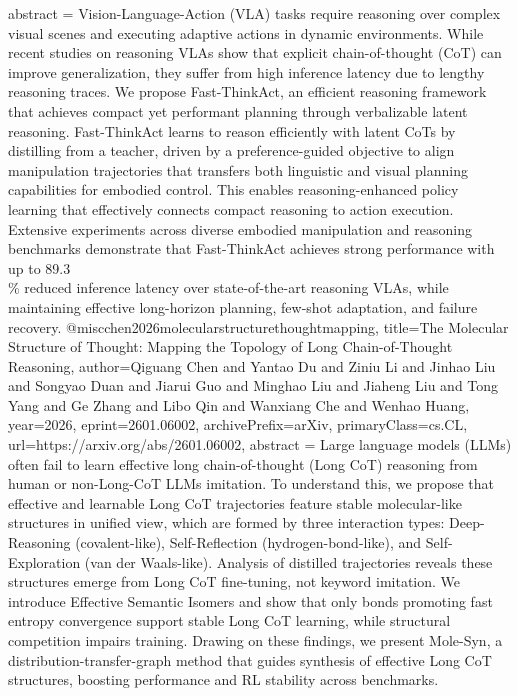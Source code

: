 {      abstract = {Vision-Language-Action (VLA) tasks require reasoning over complex visual scenes and executing adaptive actions in dynamic environments. While recent studies on reasoning VLAs show that explicit chain-of-thought (CoT) can improve generalization, they suffer from high inference latency due to lengthy reasoning traces. We propose Fast-ThinkAct, an efficient reasoning framework that achieves compact yet performant planning through verbalizable latent reasoning. Fast-ThinkAct learns to reason efficiently with latent CoTs by distilling from a teacher, driven by a preference-guided objective to align manipulation trajectories that transfers both linguistic and visual planning capabilities for embodied control. This enables reasoning-enhanced policy learning that effectively connects compact reasoning to action execution. Extensive experiments across diverse embodied manipulation and reasoning benchmarks demonstrate that Fast-ThinkAct achieves strong performance with up to 89.3\\\% reduced inference latency over state-of-the-art reasoning VLAs, while maintaining effective long-horizon planning, few-shot adaptation, and failure recovery.}
}@misc{chen2026molecularstructurethoughtmapping,
      title={The Molecular Structure of Thought: Mapping the Topology of Long Chain-of-Thought Reasoning}, 
      author={Qiguang Chen and Yantao Du and Ziniu Li and Jinhao Liu and Songyao Duan and Jiarui Guo and Minghao Liu and Jiaheng Liu and Tong Yang and Ge Zhang and Libo Qin and Wanxiang Che and Wenhao Huang},
      year={2026},
      eprint={2601.06002},
      archivePrefix={arXiv},
      primaryClass={cs.CL},
      url={https://arxiv.org/abs/2601.06002},
      abstract = {Large language models (LLMs) often fail to learn effective long chain-of-thought (Long CoT) reasoning from human or non-Long-CoT LLMs imitation. To understand this, we propose that effective and learnable Long CoT trajectories feature stable molecular-like structures in unified view, which are formed by three interaction types: Deep-Reasoning (covalent-like), Self-Reflection (hydrogen-bond-like), and Self-Exploration (van der Waals-like). Analysis of distilled trajectories reveals these structures emerge from Long CoT fine-tuning, not keyword imitation. We introduce Effective Semantic Isomers and show that only bonds promoting fast entropy convergence support stable Long CoT learning, while structural competition impairs training. Drawing on these findings, we present Mole-Syn, a distribution-transfer-graph method that guides synthesis of effective Long CoT structures, boosting performance and RL stability across benchmarks.}
}
